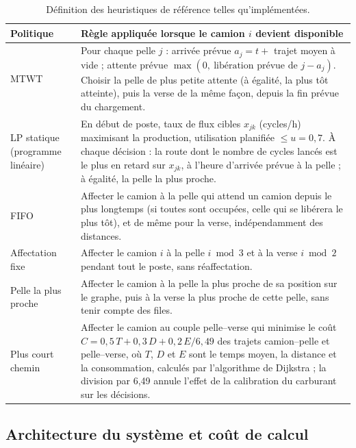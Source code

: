 \documentclass[11pt,a4paper]{article}
\newif\ifrevmarks
\newcommand{\revtag}[1]{\ifrevmarks\textsuperscript{\textcolor{red!70!black}{\scriptsize[#1]}}\fi}
\newcommand{\rev}[2]{\ifrevmarks{\color{revcolor}#2}\revtag{#1}\else#2\fi}
\newif\ifcorrmarks
\newcommand{\corr}[1]{\ifcorrmarks\textcolor{corrcolor}{#1}\else#1\fi}
\begin{document}
\begin{table}[H]
\centering
\caption{\rev{M25, Dir. corr. 1, v3}{Définition des heuristiques de référence telles qu'implémentées.}}
\label{tab:baselines}
\small
\begin{tabularx}{\textwidth}{lX}
\toprule
\textbf{Politique} & \textbf{Règle appliquée lorsque le camion $i$ devient disponible} \\
\midrule
MTWT & Pour chaque pelle $j$ : arrivée prévue $a_j = t + $ trajet moyen à vide ; attente prévue $\max(0,\ \text{libération prévue de } j - a_j)$. Choisir la pelle de plus petite attente (à égalité, la plus tôt atteinte), puis la verse de la même façon, depuis la fin prévue du chargement. \\
\corr{LP statique} (programme linéaire) & En début de poste, taux de flux cibles $x_{jk}$ (cycles/h) maximisant la production, utilisation planifiée $\leq u = 0{,}7$. À chaque décision : la route dont le nombre de cycles lancés est le plus en retard sur $x_{jk}$, à l'heure d'arrivée prévue à la pelle ; à égalité, la pelle la plus proche. \\
FIFO & Affecter le camion à la pelle qui attend un camion depuis le plus longtemps (si toutes sont occupées, celle qui se libérera le plus tôt), et de même pour la verse, indépendamment des distances. \\
Affectation fixe & Affecter le camion $i$ à la pelle $i \bmod 3$ et à la verse $i \bmod 2$ pendant tout le poste, sans réaffectation. \\
Pelle la plus proche & Affecter le camion à la pelle la plus proche de sa position sur le graphe, puis à la verse la plus proche de cette pelle, sans tenir compte des files. \\
Plus court chemin & Affecter le camion au couple pelle--verse qui minimise le coût $C = 0{,}5\,T + 0{,}3\,D + 0{,}2\,E/6{,}49$ des trajets camion--pelle et pelle--verse, où $T$, $D$ et $E$ sont le temps moyen, la distance et la consommation, calculés par l'algorithme de Dijkstra ; la division par 6,49 annule l'effet de la calibration du carburant sur les décisions. \\
\bottomrule
\end{tabularx}
\end{table}

\subsection{Architecture du système et coût de calcul}
\label{sec:compute}
\end{document}
